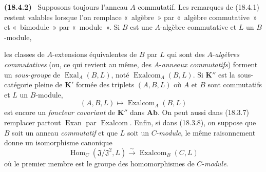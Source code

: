 \documentclass[10pt,oneside]{book}
\makeatletter
\newcommand{\setmanualcurrentlabel}[1]{\def\@currentlabel{#1}}
\newcommand{\oldpage}[2][]{%
  \setcounter{footnote}{0}%
  \marginpar{\scriptsize\textbf{#1}~|~#2}\ignorespaces}
\newenvironment{env}[1][]{\setmanualcurrentlabel{#1}\par\medskip\noindent\textbf{(#1)}\ }{\par}
\makeatother
\begin{document}
\begin{env}[18.4.2]
\label{0.18.4.2-fr}
Supposons toujours l'anneau $A$ commutatif. Les remarques de (18.4.1) restent
valables lorsque l'on remplace «~algèbre~» par «~algèbre commutative~» et
«~bimodule~» par «~module~». Si $B$ est une $A$-algèbre commutative et $L$ un
$B$-module,

\oldpage[0\textsubscript{IV-1}]{65}

les classes de $A$-extensions équivalentes de $B$ par $L$ qui sont des
$A$-\emph{algèbres commutatives} (ou, ce qui revient au même, des
$A$-\emph{anneaux commutatifs}) forment un \emph{sous-groupe} de
$\operatorname{Exal}_A(B,L)$, noté $\operatorname{Exalcom}_A(B,L)$. Si
$\mathbf K''$ est la sous-catégorie pleine de $\mathbf K'$ formée des triplets
$(A,B,L)$ où $A$ et $B$ sont commutatifs et $L$ un $B$-module,
\[
  (A,B,L)\longmapsto\operatorname{Exalcom}_A(B,L)
\]
est encore un \emph{foncteur covariant} de $\mathbf K''$ dans $\mathbf{Ab}$. On
peut aussi dans (18.3.7) remplacer partout $\operatorname{Exan}$ par
$\operatorname{Exalcom}$. Enfin, si dans (18.3.8), on suppose que $B$ soit un
anneau \emph{commutatif} et que $L$ soit un $C$-\emph{module}, le même
raisonnement donne un isomorphisme canonique
\begin{equation}
\label{0.18.4.2.1-fr}
\tag{18.4.2.1}
  \operatorname{Hom}_C(\mathfrak J/\mathfrak J^2,L)
  \xrightarrow{\sim}\operatorname{Exalcom}_B(C,L)
\end{equation}
où le premier membre est le groupe des homomorphismes de $C$-\emph{module}.
\end{env}
\end{document}
